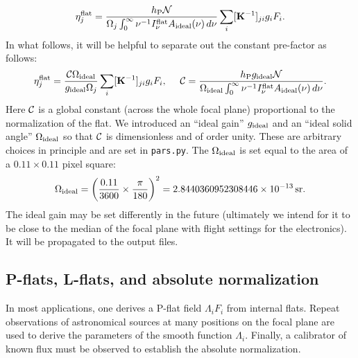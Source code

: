\documentclass[prd,onecolumn,nofootinbib,nobibnotes]{revtex4}
\begin{document}
\begin{equation}
\eta_j^{\rm flat} =  \frac{h_{\rm P}{\cal N}}{\Omega_j\int_0^\infty \nu^{-1} I^{\rm flat}_\nu A_{{\rm ideal}}(\nu) \,d\nu} \sum_i [{\bf K}^{-1}]_{ji} g_i  F_i.
\end{equation}
In what follows, it will be helpful to separate out the constant pre-factor as follows:
\begin{equation}
\eta_j^{\rm flat} = \frac{{\cal C}\Omega_{\rm ideal}}{g_{\rm ideal} \Omega_j} \sum_i [{\bf K}^{-1}]_{ji} g_i  F_i,
~~~~{\cal C} = \frac{h_{\rm P}g_{\rm ideal}{\cal N}}{\Omega_{\rm ideal} \int_0^\infty \nu^{-1} I^{\rm flat}_\nu A_{{\rm ideal}}(\nu) \,d\nu} .
\label{eq:eta-flat}
\end{equation}
Here ${\cal C}$ is a global constant (across the whole focal plane) proportional to the normalization of the flat. We introduced an ``ideal gain'' $g_{\rm ideal}$ and an ``ideal solid angle'' $\Omega_{\rm ideal}$ so that ${\cal C}$ is dimensionless and of order unity. These are arbitrary choices in principle and are set in {\tt pars.py}. The $\Omega_{\rm ideal}$ is set equal to the area of a $0.11\times 0.11$ pixel square:
\begin{equation}
\Omega_{\rm ideal} = \left( \frac{0.11}{3600}\times\frac{\pi}{180}\right)^2 = 2.8440360952308446\times 10^{-13}\,{\rm sr}.
\end{equation}
The ideal gain may be set differently in the future (ultimately we intend for it to be close to the median of the focal plane with flight settings for the electronics). It will be propagated to the output files.

\subsection{P-flats, L-flats, and absolute normalization}

In most applications, one derives a P-flat field $\Lambda_i F_i$ from internal flats. Repeat observations of astronomical sources at many positions on the focal plane are used to derive the parameters of the smooth function $\Lambda_i$. Finally, a calibrator of known flux must be observed to establish the absolute normalization.
\end{document}
